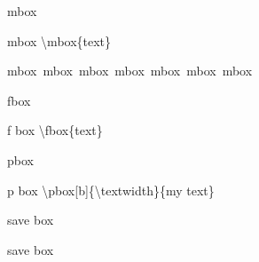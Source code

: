 \documentclass[ aspectratio=149,  10pt,blue,xcolor=pdftex,dvipsnames,table,handout,notes]{beamer}
\begin{document}
		\begin{frame}[t]{mbox}


			\begin{block} {mbox}
			\textbackslash mbox\{text\}
			\end{block}

			\begin{example}
			\mbox{mbox mbox mbox mbox mbox mbox mbox}
			\end{example}


		\note[item]{}
 		\end{frame}

		\begin{frame}[t]{fbox}


			\begin{block} {f box}
			\textbackslash fbox\{text\}
			\end{block}

			\begin{example}
			\end{example}

		\note[item]{}
		\end{frame}

		\begin{frame}[t]{pbox}


			\begin{block} {p box}
			\textbackslash pbox[b]\{\textbackslash textwidth\}\{my text\}
			\end{block}

			\begin{example}
			\end{example}


		\note[item]{}
		\end{frame}

		\begin{frame}[t]{save box}


			\begin{block} {save box}
			\end{block}

		\note[item]{}
		\end{frame}
\end{document}
